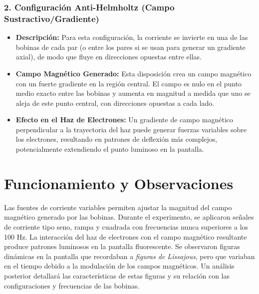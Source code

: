 \subsubsection{2. Configuración Anti-Helmholtz (Campo Sustractivo/Gradiente)}
\begin{itemize}
  \item \textbf{Descripción:} Para esta configuración, la corriente se invierte
    en una de las bobinas de cada par (o entre los pares si se usan para generar
    un gradiente axial), de modo que fluye en direcciones opuestas entre ellas.
  \item \textbf{Campo Magnético Generado:} Esta disposición crea un campo
    magnético con un fuerte gradiente en la región central. El campo es nulo en
    el punto medio exacto entre las bobinas y aumenta en magnitud a medida que
    uno se aleja de este punto central, con direcciones opuestas a cada lado.
  \item \textbf{Efecto en el Haz de Electrones:} Un gradiente de campo magnético
    perpendicular a la trayectoria del haz puede generar fuerzas
    variables sobre los electrones, resultando en patrones de deflexión más
    complejos, potencialmente extendiendo el punto luminoso en la pantalla.
\end{itemize}

\section{Funcionamiento y Observaciones}
Las fuentes de corriente variables permiten ajustar la magnitud del campo
magnético generado por las bobinas. Durante el experimento, se aplicaron
señales de corriente tipo seno, rampa y cuadrada con
frecuencias nunca superiores a los 100 Hz. La interacción del haz de
electrones con el campo magnético resultante produce patrones luminosos en la
pantalla fluorescente. Se observaron figuras dinámicas en la pantalla que
recordaban a \emph{figuras de Lissajous}, pero que variaban en el tiempo
debido a la modulación de los campos magnéticos. Un análisis posterior detallará
las características de estas figuras y su relación con las configuraciones y
frecuencias de las bobinas.
